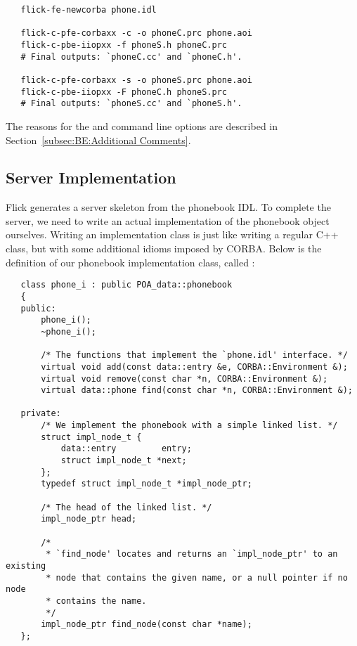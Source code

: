 \begin{verbatim}
   flick-fe-newcorba phone.idl

   flick-c-pfe-corbaxx -c -o phoneC.prc phone.aoi
   flick-c-pbe-iiopxx -f phoneS.h phoneC.prc
   # Final outputs: `phoneC.cc' and `phoneC.h'.

   flick-c-pfe-corbaxx -s -o phoneS.prc phone.aoi
   flick-c-pbe-iiopxx -F phoneC.h phoneS.prc
   # Final outputs: `phoneS.cc' and `phoneS.h'.
\end{verbatim}

\noindent The reasons for the  and  command line options
are described in Section~\ref{subsec:BE:Additional Comments}.



\subsection{Server Implementation}
\label{subsec:CORBAXX:Server Implementation}

Flick generates a server skeleton from the phonebook IDL\@.  To complete the
server, we need to write an actual implementation of the phonebook object
ourselves.  Writing an implementation class is just like writing a regular C++
class, but with some additional idioms imposed by CORBA\@.  Below is the
definition of our phonebook implementation class, called :

\begin{verbatim}
   class phone_i : public POA_data::phonebook
   {
   public:
       phone_i();
       ~phone_i();

       /* The functions that implement the `phone.idl' interface. */
       virtual void add(const data::entry &e, CORBA::Environment &);
       virtual void remove(const char *n, CORBA::Environment &);
       virtual data::phone find(const char *n, CORBA::Environment &);

   private:
       /* We implement the phonebook with a simple linked list. */
       struct impl_node_t {
           data::entry         entry;
           struct impl_node_t *next;
       };
       typedef struct impl_node_t *impl_node_ptr;

       /* The head of the linked list. */
       impl_node_ptr head;

       /*
        * `find_node' locates and returns an `impl_node_ptr' to an existing
        * node that contains the given name, or a null pointer if no node
        * contains the name.
        */
       impl_node_ptr find_node(const char *name);
   };
\end{verbatim}

